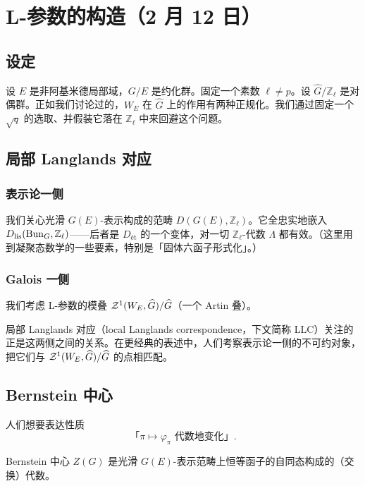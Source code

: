 \section[L-参数的构造]{L-参数的构造（2 月 12 日）}


\subsection{设定}

设 $E$ 是非阿基米德局部域，$G/E$ 是约化群。固定一个素数 $\ell\neq p$。设 $\widehat G/\mathbb Z_\ell$ 是对偶群。正如我们讨论过的，$W_E$ 在 $\widehat G$ 上的作用有两种正规化。我们通过固定一个 $\sqrt q$ 的选取、并假装它落在 $\mathbb Z_\ell$ 中来回避这个问题。

\subsection{局部 Langlands 对应}

\subsubsection{表示论一侧}

我们关心光滑 $G(E)$-表示构成的范畴 $D(G(E),\mathbb Z_\ell)$。它全忠实地嵌入 $D_{\mathrm{lis}}(\mathrm{Bun}_G,\mathbb Z_\ell)$——后者是 $D_{\text{ét}}$ 的一个变体，对一切 $\mathbb Z_\ell$-代数 $\Lambda$ 都有效。（这里用到凝聚态数学的一些要素，特别是「固体六函子形式化」。）

\subsubsection{Galois 一侧}

我们考虑 L-参数的模叠 $\mathcal{Z}^1(W_E,\widehat G)/\widehat G$（一个 Artin 叠）。

局部 Langlands 对应（local Langlands correspondence，下文简称 LLC）关注的正是这两侧之间的关系。在更经典的表述中，人们考察表示论一侧的不可约对象，把它们与 $\mathcal{Z}^1(W_E,\widehat G)/\widehat G$ 的点相匹配。

\subsection{Bernstein 中心}

人们想要表达性质
\[
\text{「}\pi\mapsto\varphi_\pi\text{ 代数地变化」}.
\]

\begin{definition}
Bernstein 中心 $Z(G)$ 是光滑 $G(E)$-表示范畴上恒等函子的自同态构成的（交换）代数。
\end{definition}

